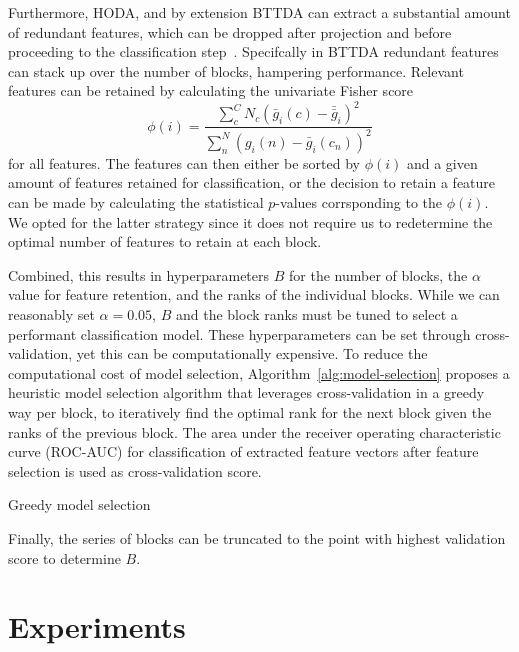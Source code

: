 \documentclass[twocolumn]{article}
\begin{document}
Furthermore, \textsc{HODA}, and by extension \textsc{BTTDA} can extract a substantial amount
of redundant features, which can be dropped after projection and before proceeding to the classification
step~\cite{Phan2010}.
Specifcally in \textsc{BTTDA} redundant features can stack up over the number of
blocks, hampering performance.
Relevant features can be retained by calculating the
univariate Fisher score
\begin{equation}
	\phi(i) = \frac
	{\sum_c^C N_c \left(\bar{g}_i(c)-\bar{\bar{g}}_i\right)^2}
	{\sum_n^N \left(g_i(n)-\bar{g}_i(c_n)\right)^2}
\end{equation}
for all features.
The features can then either be sorted by $\phi(i)$ and a given amount of
features retained for classification, or the decision to retain a feature can
be made by calculating the statistical $p$-values corrsponding to the
$\phi(i)$.
We opted for the latter strategy since it does not require us to redetermine the
optimal number of features to retain at each block.

Combined, this results in hyperparameters $B$ for the number of blocks, the
$\alpha$ value for feature retention, and the ranks of the individual blocks.
While we can reasonably set $\alpha=0.05$, $B$ and the block ranks must be
tuned to select a performant classification model.
These hyperparameters can be set through cross-validation, yet this can be
computationally expensive.
To reduce the computational cost of model selection,
Algorithm~\ref{alg:model-selection} proposes a heuristic model selection
algorithm that leverages cross-validation in a greedy way per block, to
iteratively find the optimal rank for the next block given the ranks of the
previous block.
The area under the receiver operating characteristic curve (ROC-AUC) for
classification of extracted feature vectors after feature selection is used as
cross-validation score.
\begin{algorithm}
	\caption{Greedy model selection}
	\label{alg:model-selection}
	
\end{algorithm}
Finally, the series of blocks can be truncated to the point with
highest validation score to determine $B$.

\section{Experiments}
\end{document}
